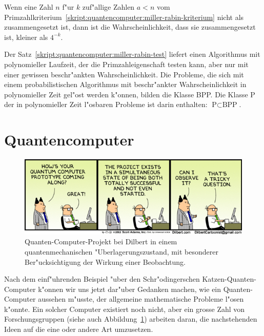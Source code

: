 \begin{satz}
\label{skript:quantencomputer:miller-rabin-test}
Wenn eine Zahl $n$ f"ur $k$ zuf"allige Zahlen $a<n$ vom
Primzahlkriterium~\ref{skript:quantencomputer:miller-rabin-kriterium}
nicht als zusammengesetzt ist, dann ist die Wahrscheinlichkeit,
dass sie zusammengesetzt ist, kleiner als $4^{-k}$.
\end{satz}

Der Satz~\ref{skript:quantencomputer:miller-rabin-test} liefert einen Algorithmus
mit polynomieller Laufzeit, der die Primzahleigenschaft testen kann,
aber nur mit einer gewissen beschr"ankten Wahrscheinlichkeit.
Die Probleme, die sich mit einem probabilistischen Algorithmus mit
beschr"ankter Wahrscheinlichkeit in polynomieller Zeit gel"ost
werden k"onnen, bilden die Klasse BPP.
Die Klasse P der in polynomieller Zeit l"osbaren Probleme ist darin
enthalten: $\text{P}\subset\text{BPP}$.

\section{Quantencomputer}
\begin{figure}
\centering
\includegraphics[width=\hsize]{images/dilbert.png}
\caption{Quanten-Computer-Projekt bei Dilbert in einem quantenmechanischen
"Uberlagerungszustand, mit besonderer Ber"ucksichtigung der Wirkung einer
Beobachtung.
\label{skript:dilbert}}
\end{figure}
Nach dem einf"uhrenden Beispiel "uber den Schr"odingerschen
Katzen-Quanten-Computer k"onnen wir uns jetzt dar"uber Gedanken
machen, wie ein Quanten-Computer aussehen m"usste, der allgemeine
mathematische Probleme l"osen k"onnte.
Ein solcher Computer existiert noch nicht, aber ein grosse Zahl von 
Forschungsgruppen (siehe auch Abbildung~\ref{skript:dilbert})
arbeiten daran, die nachstehenden Ideen auf die eine
oder andere Art umzusetzen.

